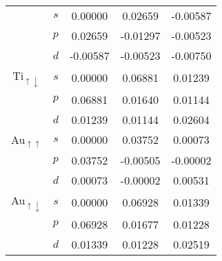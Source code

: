 \begin{center}
\begin{small}
\begin{tabular}{|cc|ccc|}
&$s$ & 0.00000& 0.02659&-0.00587\\
&$p$ & 0.02659&-0.01297&-0.00523\\
&$d$ &-0.00587&-0.00523&-0.00750\\\cline{3-5}
Ti$_{\uparrow\downarrow}$
&$s$ &0.00000& 0.06881& 0.01239\\
&$p$ &0.06881& 0.01640& 0.01144\\
&$d$ &0.01239& 0.01144& 0.02604\\\hline
Au$_{\uparrow\uparrow}$
&$s$ &0.00000& 0.03752& 0.00073\\
&$p$ &0.03752&-0.00505&-0.00002\\
&$d$ &0.00073&-0.00002& 0.00531\\\cline{3-5}
Au$_{\uparrow\downarrow}$
&$s$ &0.00000& 0.06928& 0.01339\\
&$p$ &0.06928& 0.01677& 0.01228\\
&$d$ &0.01339& 0.01228& 0.02519\\\hline
\end{tabular}
\end{small}
\end{center}
